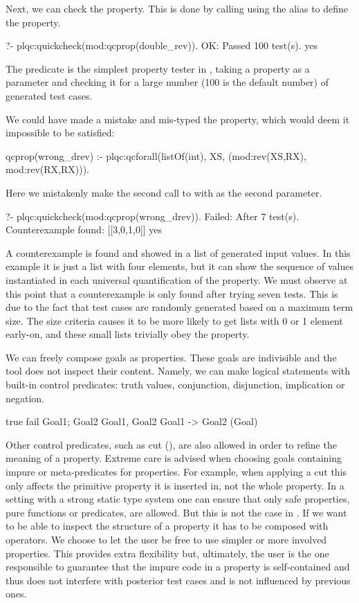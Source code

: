 Next, we can check the property.
%
This is done by calling \plqc{} using the alias
 to define the property.
\begin{yapcode}
   ?- plqc:quickcheck(mod:qcprop(double_rev)).
 OK: Passed 100 test(s).
 yes
\end{yapcode}
%
The  predicate is the simplest property tester in
\plqc{}, taking a property as a parameter and checking it for a large
number (100 is the default number) of generated test cases.


We could have made a mistake and mis-typed the property, which would deem
it impossible to be satisfied:
%
\begin{yapcode}
 qcprop(wrong_drev) :-
   plqc:qcforall(listOf(int), XS,
                 (mod:rev(XS,RX),
                  mod:rev(RX,RX))).
\end{yapcode}
%
Here we mistakenly make the second call to  with  as
the second parameter.
%
\begin{yapcode}
   ?- plqc:quickcheck(mod:qcprop(wrong_drev)).
 Failed: After 7 test(s).
 Counterexample found: [[3,0,1,0]] 
 yes
\end{yapcode}
A counterexample is found and showed in a list of generated input
values.
%
In this example it is just a list with four elements, but it can show
the sequence of values instantiated in each universal quantification of
the property.
%
We must observe at this point that a counterexample is only found
after trying seven tests.
%
This is due to the fact that test cases are randomly generated based on
a maximum term size.
%
The size criteria causes it to be more likely to get lists with 0 or 1
element early-on, and these small lists trivially obey the property.


We can freely compose \Prolog{} goals as properties.
%
These goals are indivisible and the tool does not inspect their content.
%
Namely, we can make logical statements with built-in control predicates:
truth values, conjunction, disjunction, implication or negation.
%
\begin{yapcode}
   true
   fail
   Goal1; Goal2
   Goal1, Goal2
   Goal1 -> Goal2
   \+(Goal)
\end{yapcode}
%
Other control predicates, such as cut (\yap{!}), are also allowed in
order to refine the meaning of a property.
%
Extreme care is advised when choosing goals containing impure or
meta-predicates for properties.
%
For example, when applying a cut this only affects the primitive
property it is inserted in, not the whole property.
%
In a setting with a strong static type system one can ensure that only
safe properties, pure functions or predicates, are allowed.
%
But this is not the case in \Prolog{}.
%
If we want \plqc{} to be able to inspect the structure of a property
it has to be composed with \plqc{} operators.
%
We choose to let the user be free to use simpler or more involved
properties.
%
This provides extra flexibility but, ultimately, the user
is the one responsible to guarantee that the impure code in a property
is self-contained and thus does not interfere with posterior test
cases and is not influenced by previous ones.


